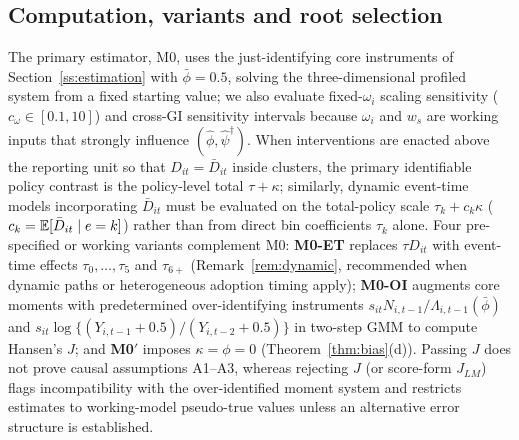 \subsection{Computation, variants and root selection}
\label{ss:computation}

The primary estimator, M0, uses the just-identifying core instruments of Section~\ref{ss:estimation}
with $\bar\phi=0.5$, solving the three-dimensional profiled system from a fixed starting value; we also
evaluate fixed-$\omega_i$ scaling sensitivity ($c_\omega\in[0.1,10]$) and cross-GI sensitivity
intervals because $\omega_i$ and $w_s$ are working inputs that strongly influence $(\hat\phi,\hat\psi^\dagger)$.
When interventions are enacted above the reporting unit so that $D_{it}=\bar D_{it}$ inside
clusters, the primary identifiable policy contrast is the policy-level total $\tau+\kappa$;
similarly, dynamic event-time models incorporating $\bar D_{it}$ must be evaluated on the
total-policy scale $\tau_k+c_k\kappa$ ($c_k=\mathbb{E}[\bar D_{it}\mid e=k]$) rather than from direct
bin coefficients $\tau_k$ alone. Four pre-specified or working variants complement M0:
\textbf{M0-ET} replaces $\tau D_{it}$ with event-time effects $\tau_0,\dots,\tau_5$ and $\tau_{6+}$
(Remark~\ref{rem:dynamic}, recommended when dynamic paths or heterogeneous adoption timing apply);
\textbf{M0-OI} augments core moments with predetermined over-identifying instruments
$s_{it}N_{i,t-1}/\Lambda_{i,t-1}(\bar\phi)$ and
$s_{it}\log\{(Y_{i,t-1}+0.5)/(Y_{i,t-2}+0.5)\}$ in two-step GMM to compute Hansen's $J$;
and \textbf{M0$'$} imposes $\kappa=\phi=0$ (Theorem~\ref{thm:bias}(d)). Passing
$J$ does not prove causal assumptions A1--A3, whereas rejecting $J$ (or score-form $J_{LM}$) flags
incompatibility with the over-identified moment system and restricts estimates to working-model
pseudo-true values unless an alternative error structure is established.

